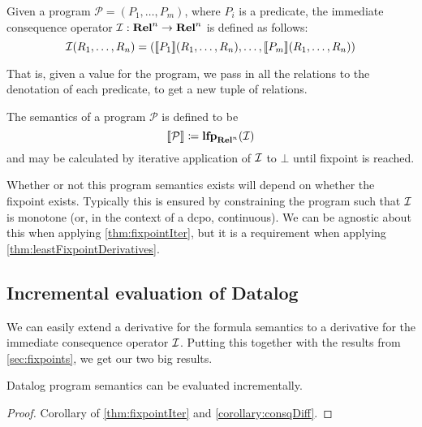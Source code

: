 \begin{defn}
  Given a program $\mathcal{P} = (P_1, \dots, P_m)$, where $P_i$ is a predicate,
  the immediate consequence operator $\mathcal{I}: \mathbf{Rel}^n \rightarrow \mathbf{Rel}^n$ is defined as follows:
  \begin{displaymath}
    \mathcal{I}(R_1, \dots, R_n) = (\llbracket P_1 \rrbracket(R_1, \dots, R_n), \dots, \llbracket P_m \rrbracket(R_1, \dots, R_n))
  \end{displaymath}
\end{defn}

That is, given a value for the program, we pass in all the relations
to the denotation of each predicate, to get a new tuple of relations.

\begin{defn}
  The semantics of a program $\mathcal{P}$ is defined to be
  \begin{displaymath}
    \llbracket \mathcal{P} \rrbracket \coloneqq \mathbf{lfp}_{\mathbf{Rel}^n}(\mathcal{I})
  \end{displaymath}
  and may be calculated by iterative application of $\mathcal{I}$ to $\bot$ until
  fixpoint is reached.
\end{defn}

Whether or not this program semantics exists will depend on whether the fixpoint
exists. Typically this is ensured by constraining the program such that $\mathcal{I}$
is monotone (or, in the context of a dcpo, continuous). We can be agnostic
about this when applying \cref{thm:fixpointIter}, but it is a requirement when
applying \cref{thm:leastFixpointDerivatives}.

\subsection{Incremental evaluation of Datalog}
\label{sec:datalogIncr}

We can easily extend a derivative for the formula semantics to a derivative for
the immediate consequence operator $\mathcal{I}$. Putting this together with the
results from \cref{sec:fixpoints}, we get our two big results.

\begin{corollary}
\label{thm:diffEval}
  Datalog program semantics can be evaluated incrementally.
\end{corollary}
\ifproofs
\begin{proof}
  Corollary of \cref{thm:fixpointIter} and \cref{corollary:consqDiff}.
\end{proof}
\fi

